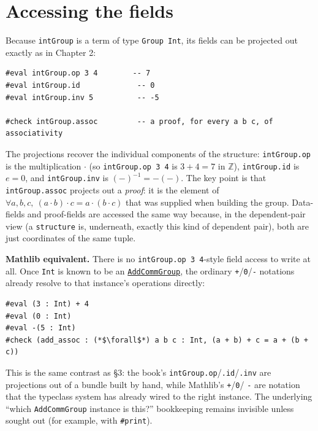\section{Accessing the fields}\label{sec:06-groups:05-accessing-fields:1}

Because \texttt{intGroup} is a term of type \texttt{Group Int}, its fields can be projected out exactly as in Chapter 2:

\begin{lstlisting}
#eval intGroup.op 3 4        -- 7
#eval intGroup.id             -- 0
#eval intGroup.inv 5          -- -5

#check intGroup.assoc         -- a proof, for every a b c, of associativity
\end{lstlisting}

\begin{mathreading}

The projections recover the individual components of the structure: \texttt{intGroup.op} is the multiplication \(\cdot\) (so \texttt{intGroup.op 3 4} is \(3 + 4 = 7\) in \(\mathbb{Z}\)), \texttt{intGroup.id} is \(e = 0\), and \texttt{intGroup.inv} is \((-)^{-1} = -(-)\). The key point is that \texttt{intGroup.assoc} projects out a \emph{proof}: it is the element of \(\forall
a,b,c,\ (a\cdot b)\cdot c = a\cdot(b\cdot c)\) that was supplied when building the group. Data-fields and proof-fields are accessed the same way because, in the dependent-pair view (a \texttt{structure} is, underneath, exactly this kind of dependent pair), both are just coordinates of the same tuple.

\end{mathreading}

\textbf{Mathlib equivalent.} There is no \texttt{intGroup.op 3 4}-style field access to write at all. Once \texttt{Int} is known to be an \href{https://loogle.lean-lang.org/?q=AddCommGroup}{\texttt{AddCommGroup}}, the ordinary \texttt{+}/\texttt{0}/\texttt{-\allowbreak{}} notations already resolve to that instance's operations directly:

\begin{lstlisting}
#eval (3 : Int) + 4
#eval (0 : Int)
#eval -(5 : Int)
#check (add_assoc : (*$\forall$*) a b c : Int, (a + b) + c = a + (b + c))
\end{lstlisting}

This is the same contrast as §3: the book's \texttt{intGroup.op}/\texttt{.id}/\texttt{.inv} are projections out of a bundle built by hand, while Mathlib's \texttt{+}/\texttt{0}/ \texttt{-\allowbreak{}} are notation that the typeclass system has already wired to the right instance. The underlying ``which \texttt{AddCommGroup} instance is this?'' bookkeeping remains invisible unless sought out (for example, with \texttt{\#print}).
